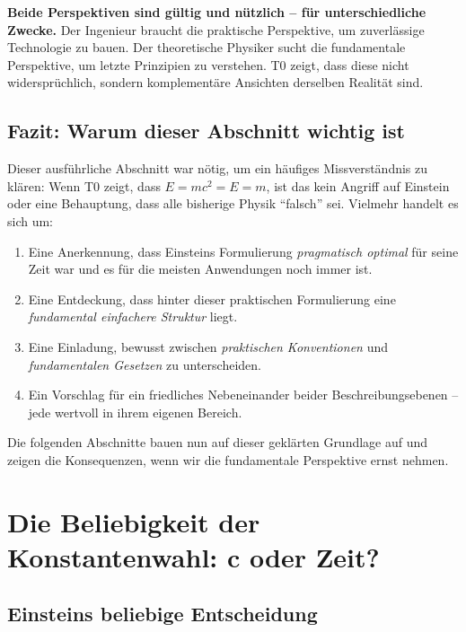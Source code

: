 	\textbf{Beide Perspektiven sind gültig und nützlich – für unterschiedliche Zwecke.} Der Ingenieur braucht die praktische Perspektive, um zuverlässige Technologie zu bauen. Der theoretische Physiker sucht die fundamentale Perspektive, um letzte Prinzipien zu verstehen. T0 zeigt, dass diese nicht widersprüchlich, sondern komplementäre Ansichten derselben Realität sind.
	
	\subsection{Fazit: Warum dieser Abschnitt wichtig ist}
	
	Dieser ausführliche Abschnitt war nötig, um ein häufiges Missverständnis zu klären: Wenn T0 zeigt, dass \( E = mc^2 = E = m \), ist das kein Angriff auf Einstein oder eine Behauptung, dass alle bisherige Physik ``falsch'' sei. Vielmehr handelt es sich um:
	
	\begin{enumerate}
		\item Eine Anerkennung, dass Einsteins Formulierung \textit{pragmatisch optimal} für seine Zeit war und es für die meisten Anwendungen noch immer ist.
		
		\item Eine Entdeckung, dass hinter dieser praktischen Formulierung eine \textit{fundamental einfachere Struktur} liegt.
		
		\item Eine Einladung, bewusst zwischen \textit{praktischen Konventionen} und \textit{fundamentalen Gesetzen} zu unterscheiden.
		
		\item Ein Vorschlag für ein friedliches Nebeneinander beider Beschreibungsebenen – jede wertvoll in ihrem eigenen Bereich.
	\end{enumerate}
	
	Die folgenden Abschnitte bauen nun auf dieser geklärten Grundlage auf und zeigen die Konsequenzen, wenn wir die fundamentale Perspektive ernst nehmen.
	
	\section{Die Beliebigkeit der Konstantenwahl: c oder Zeit?}
	
	\subsection{Einsteins beliebige Entscheidung}
	
